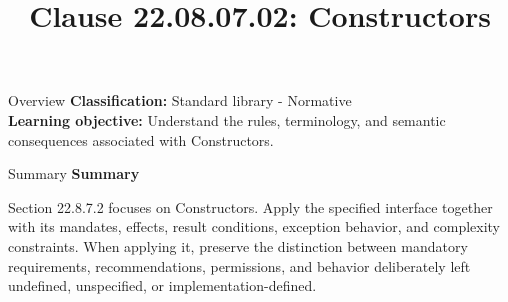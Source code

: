 \documentclass[10pt,letterpaper]{article}
\title{Clause 22.08.07.02: Constructors}
\author{}
\date{}
\begin{document}
\maketitle
\begin{CornellOverviewBox}{Overview}
\textbf{Classification:} Standard library - Normative\\[2pt]
\textbf{Learning objective:} Understand the rules, terminology, and semantic consequences associated with Constructors.
\end{CornellOverviewBox}\begin{CornellSummaryBox}{Summary}
{\sffamily\bfseries\color{Accent} Summary}\par\vspace{3pt}Section 22.8.7.2 focuses on Constructors. Apply the specified interface together with its mandates, effects, result conditions, exception behavior, and complexity constraints. When applying it, preserve the distinction between mandatory requirements, recommendations, permissions, and behavior deliberately left undefined, unspecified, or implementation-defined.
\end{CornellSummaryBox}
\end{document}
